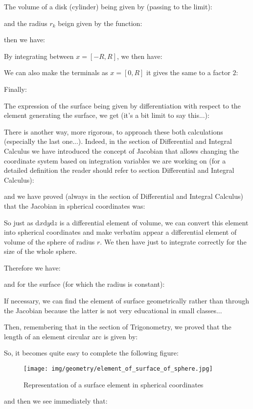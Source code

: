 {	The volume of a disk (cylinder) being given by (passing to the limit):
	
	and the radius $r_k$ beign given by the function:
	
	then we have:
	
	By integrating between $x=[-R,R]$, we then have:
	
	We can also make the terminals as $x=[0,R]$ it gives the same to a factor $2$:
	
	Finally:
	
	The expression of the surface being given by differentiation with respect to the element generating the surface, we get (it's a bit limit to say this...):
	
	There is another way, more rigorous, to approach these both calculations (especially the last one...). Indeed, in the section of Differential and Integral Calculus we have introduced the concept of Jacobian that allows changing the coordinate system based on integration variables we are working on (for a detailed definition the reader should refer to section Differential and Integral Calculus):
	
	and we have proved (always in the section of Differential and Integral Calculus) that the Jacobian in spherical coordinates was:
	
	So just as $\mathrm{d}x\mathrm{d}y\mathrm{d}z$ is a differential element of volume, we can convert this element into spherical coordinates and make verbatim appear a differential element of volume of the sphere of radius $r$. We then have just to integrate correctly for the size of the whole sphere.

	Therefore we have:
	
	and for the surface (for which the radius is constant):
	
	If necessary, we can find the element of surface geometrically rather than through the Jacobian because the latter is not very educational in small classes...
	
	Then, remembering that in the section of Trigonometry, we proved that the length of an element circular arc is given by:
	
	So, it becomes quite easy to complete the following figure:
	\begin{figure}[H]
		\centering
		\texttt{[image: img/geometry/element\_of\_surface\_of\_sphere.jpg]}
		\caption{Representation of a surface element in spherical coordinates}
	\end{figure}
	and then we see immediately that:
	
}
